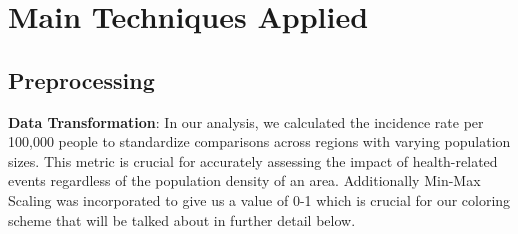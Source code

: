 \documentclass[sigconf,screen,nonacm]{acmart}
\begin{document}
\section{Main Techniques Applied}

\subsection{Preprocessing}

\textbf{Data Transformation}: In our analysis, we calculated the incidence rate per 100,000 people to standardize comparisons across regions with varying population sizes. This metric is crucial for accurately assessing the impact of health-related events regardless of the population density of an area. Additionally Min-Max Scaling was incorporated to give us a value of 0-1 which is crucial for our coloring scheme that will be talked about in further detail below. 
\end{document}
